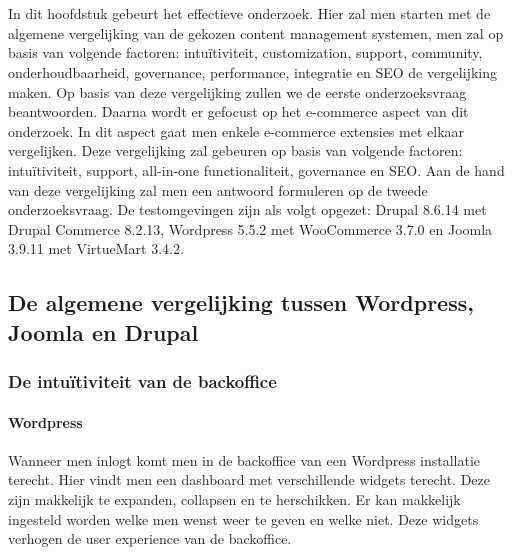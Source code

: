 
\chapter{}
\label{ch:methodologie}


In dit hoofdstuk gebeurt het effectieve onderzoek. Hier zal men starten  met de algemene vergelijking van de gekozen content management systemen, men zal op basis van volgende factoren: intuïtiviteit, customization, support, community, onderhoudbaarheid, governance, performance, integratie en SEO de vergelijking maken. Op basis van deze vergelijking zullen we de eerste onderzoeksvraag beantwoorden. Daarna wordt er gefocust op het e-commerce aspect van dit onderzoek. In dit aspect gaat men enkele e-commerce extensies met elkaar vergelijken. Deze vergelijking zal gebeuren op basis van volgende factoren: intuïtiviteit, support, all-in-one functionaliteit, governance en SEO. Aan de hand van deze vergelijking zal men een antwoord formuleren op de tweede onderzoeksvraag. De testomgevingen zijn als volgt opgezet:
Drupal 8.6.14 met Drupal Commerce 8.2.13, Wordpress 5.5.2 met WooCommerce 3.7.0 en Joomla 3.9.11 met VirtueMart 3.4.2.

\section{De algemene vergelijking tussen Wordpress, Joomla en Drupal }
\subsection{De intuïtiviteit van de backoffice}

\subsubsection{Wordpress}
Wanneer men inlogt komt men in de backoffice van een Wordpress installatie terecht. Hier vindt men een dashboard met verschillende widgets terecht. Deze zijn makkelijk te expanden, collapsen en te herschikken. Er kan makkelijk ingesteld worden welke men wenst weer te geven en welke niet. Deze widgets verhogen de user experience van de backoffice.

